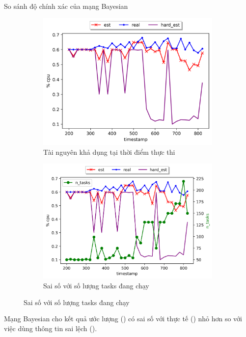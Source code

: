\documentclass[11pt,xcolor={dvipsnames}, aspectratio=169]{beamer}
\begin{document}
\begin{frame}
{So sánh độ chính xác của mạng Bayesian}
\begin{figure}
\centering
\begin{subfigure}{.5\textwidth}
  \centering
  \includegraphics[width=.75\linewidth]{images/cpu_usage_estimation_1.png}
  \caption{Tài nguyên khả dụng tại thời điểm thực thi}
  \label{fig:usage_est_a}
\end{subfigure}%
\begin{subfigure}{.5\textwidth}
  \centering
  \includegraphics[width=.8\linewidth]{images/cpu_usage_estimation_2.png}
  \caption{Sai số với số lượng tasks đang chạy}
   \label{fig:usage_est_b}
\end{subfigure}
\end{figure}
\begin{center}
Mạng Bayesian cho kết quả ước lượng ({\color{red}{màu đỏ}}) có sai số với thực tế ({\color{blue}{màu xanh dương}}) nhỏ hơn so với việc dùng thông tin sai lệch ({\color{purple}{màu tím}}).
\end{center}
\end{frame}
\end{document}

